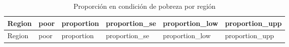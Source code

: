 \documentclass[
  spanish,
  12pt,
]{book}
\begin{document}
\begin{longtable}[]{@{}
  >{\raggedright\arraybackslash}p{}
  >{\centering\arraybackslash}p{}
  >{\centering\arraybackslash}p{}
  >{\centering\arraybackslash}p{}
  >{\centering\arraybackslash}p{}
  >{\centering\arraybackslash}p{}@{}}
\caption{\label{tab:tab-svyby-region-pobreza}Proporción en condición de pobreza por región}\tabularnewline
\toprule\noalign{}
\begin{minipage}[b]{\linewidth}\raggedright
Region
\end{minipage} & \begin{minipage}[b]{\linewidth}\centering
poor
\end{minipage} & \begin{minipage}[b]{\linewidth}\centering
proportion
\end{minipage} & \begin{minipage}[b]{\linewidth}\centering
proportion\_se
\end{minipage} & \begin{minipage}[b]{\linewidth}\centering
proportion\_low
\end{minipage} & \begin{minipage}[b]{\linewidth}\centering
proportion\_upp
\end{minipage} \\
\midrule\noalign{}
\endfirsthead
\toprule\noalign{}
\begin{minipage}[b]{\linewidth}\raggedright
Region
\end{minipage} & \begin{minipage}[b]{\linewidth}\centering
poor
\end{minipage} & \begin{minipage}[b]{\linewidth}\centering
proportion
\end{minipage} & \begin{minipage}[b]{\linewidth}\centering
proportion\_se
\end{minipage} & \begin{minipage}[b]{\linewidth}\centering
proportion\_low
\end{minipage} & \begin{minipage}[b]{\linewidth}\centering
proportion\_upp
\end{minipage} \\

\end{longtable}
\end{document}

